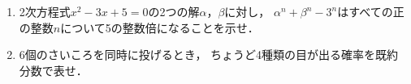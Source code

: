 \documentclass[../../main.tex]{subfiles}
\begin{document}
\begin{enumerate}
  \item 2次方程式$x^2-3x+5=0$の2つの解$\alpha$，$\beta$に対し，
    $\alpha^n+\beta^n-3^n$はすべての正の整数$n$について5の整数倍になることを示せ．
  \item 6個のさいころを同時に投げるとき，
    ちょうど4種類の目が出る確率を既約分数で表せ．
\end{enumerate}
\end{document}
